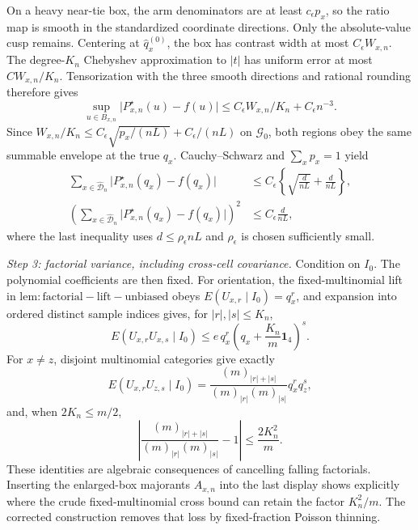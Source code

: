 On a heavy near-tie box, the arm denominators are at least \(c_\epsilon p_x\), so the ratio map is smooth in the standardized coordinate directions.  Only the absolute-value cusp remains.  Centering at \(\widehat q_x^{(0)}\), the box has contrast width at most \(C_\epsilon W_{x,n}\).  The degree-\(K_n\) Chebyshev approximation to \(\lvert t\rvert\) has uniform error at most \(C W_{x,n}/K_n\).  Tensorization with the three smooth directions and rational rounding therefore gives
\[
 \sup_{u\in B_{x,n}}
 \lvert P^\star_{x,n}(u)-f(u)\rvert
 \le C_\epsilon W_{x,n}/K_n+C_\epsilon n^{-3}.
\]
Since \(W_{x,n}/K_n\le C_\epsilon\sqrt{p_x/(nL)}+C_\epsilon/(nL)\) on \(\mathcal G_0\), both regions obey the same summable envelope at the true \(q_x\).  Cauchy--Schwarz and \(\sum_xp_x=1\) yield
\[
 \begin{aligned}
 \sum_{x\in\widehat{\mathcal D}_n}
  \lvert P^\star_{x,n}(q_x)-f(q_x)\rvert
 &\le C_\epsilon\left\{
   \sqrt{\frac d{nL}}+\frac d{nL}\right\},\\
 \left(\sum_{x\in\widehat{\mathcal D}_n}
  \lvert P^\star_{x,n}(q_x)-f(q_x)\rvert\right)^2
 &\le C_\epsilon\frac d{nL},
 \end{aligned}
\]
where the last inequality uses \(d\le\rho_\epsilon nL\) and \(\rho_\epsilon\) is chosen sufficiently small.

\emph{Step 3: factorial variance, including cross-cell covariance.}
Condition on \(I_0\).  The polynomial coefficients are then fixed.  For orientation, the fixed-multinomial lift in \(\mathrm{lem:factorial-lift-unbiased}\) obeys \(E(U_{x,r}\mid I_0)=q_x^r\), and expansion into ordered distinct sample indices gives, for \(\lvert r\rvert,\lvert s\rvert\le K_n\),
\[
 E(U_{x,r}U_{x,s}\mid I_0)
 \le e\,q_x^r\left(q_x+\frac{K_n}{m}\mathbf 1_4\right)^s.
\]
For \(x\ne z\), disjoint multinomial categories give exactly
\[
 E(U_{x,r}U_{z,s}\mid I_0)
 =\frac{(m)_{\lvert r\rvert+\lvert s\rvert}}
 {(m)_{\lvert r\rvert}(m)_{\lvert s\rvert}}
 q_x^rq_z^s,
\]
and, when \(2K_n\le m/2\),
\[
 \left\lvert
  \frac{(m)_{\lvert r\rvert+\lvert s\rvert}}
  {(m)_{\lvert r\rvert}(m)_{\lvert s\rvert}}-1
 \right\rvert
 \le\frac{2K_n^2}{m}.
\]
These identities are algebraic consequences of cancelling falling factorials.  Inserting the enlarged-box majorants \(A_{x,n}\) into the last display shows explicitly where the crude fixed-multinomial cross bound can retain the factor \(K_n^2/m\).  The corrected construction removes that loss by fixed-fraction Poisson thinning.

